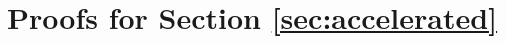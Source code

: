 \documentclass{article}
\newcommand{\dd}{\,{\rm d}}
\theoremstyle{plain}
\newtheorem*{lemma*}{Lemma}
\theoremstyle{remark}
\begin{document}
\section{Proofs for Section \ref{sec:accelerated}}\label{app:proofs-accelerated}




\end{document}
